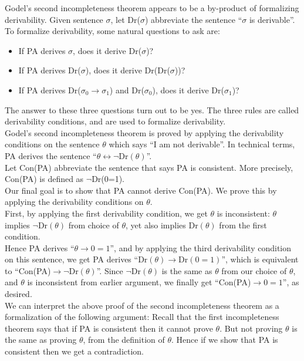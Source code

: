 Godel's second incompleteness theorem appears to be a by-product of
formalizing derivability. Given sentence $\sigma$, let Dr($\sigma$)
abbreviate the sentence ``$\sigma$ is derivable''.  To formalize
derivability, some natural questions to ask are:
\begin{itemize}
  \item If PA derives $\sigma$, does it derive Dr($\sigma$)?
  \item If PA derives Dr($\sigma$), does it derive Dr(Dr($\sigma$))?
  \item If PA derives Dr($\sigma_0\rightarrow\sigma_1$) and
    Dr($\sigma_0$), does it derive Dr($\sigma_1$)?
\end{itemize}

The answer to these three questions turn out to be yes. The three rules
are called derivability conditions, and are used to formalize
derivability.\\

Godel's second incompleteness theorem is proved by applying the
derivability conditions on the sentence $\theta$ which says ``I am not
derivable''. In technical terms, PA derives the sentence
``$\theta\leftrightarrow\neg\text{Dr}(\theta)$''.\\

Let Con(PA) abbreviate the sentence that says PA is consistent. More
precisely, Con(PA) is defined as $\neg$Dr(0=1).\\

Our final goal is to show that PA cannot derive Con(PA). We prove this
by applying the derivability conditions on $\theta$.\\

First, by applying the first derivability condition, we get $\theta$ is
inconsistent: $\theta$ implies $\neg\text{Dr}(\theta)$ from choice of
$\theta$, yet also implies $\text{Dr}(\theta)$ from the first
condition.\\

Hence PA derives ``$\theta\rightarrow0=1$'', and by applying the third
derivability condition on this sentence, we get PA derives
``$\text{Dr}(\theta)\rightarrow\text{Dr}(0=1)$'',
which is equivalent to ``Con(PA)$\rightarrow\neg\text{Dr}(\theta)$''.
Since $\neg\text{Dr}(\theta)$ is the same as $\theta$ from our choice
of $\theta$, and $\theta$ is inconsistent from earlier argument, we
finally get ``Con(PA)$\rightarrow0=1$'', as desired.\\

We can interpret the above proof of the second incompleteness theorem as a
formalization of the following argument: Recall that the first
incompleteness theorem says that if PA is consistent then it cannot prove
$\theta$. But not proving $\theta$ is the same as proving $\theta$, from
the definition of $\theta$. Hence if we show that PA is consistent then we
get a contradiction. 
